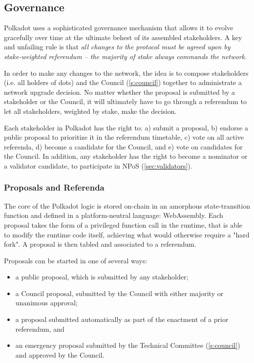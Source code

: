 \subsection{Governance}\label{sec:governance}

Polkadot uses a sophisticated governance mechanism that allows it to evolve gracefully over time at the ultimate behest of its assembled stakeholders. A key and unfailing rule is that \emph{all changes to the protocol must be agreed upon by stake-weighted referendum -- the majority of stake always commands the network.}

In order to make any changes to the network, the idea is to compose stakeholders (i.e. all holders of dots) and the Council (\autoref{s:council}) together to administrate a network upgrade decision. No matter whether the proposal is submitted by a stakeholder or the Council, it will ultimately have to go through a referendum to let all stakeholders, weighted by stake, make the decision.

Each stakeholder in Polkadot has the right to: a) submit a proposal, b) endorse a public proposal to prioritize it in the referendum timetable, c) vote on all active referenda, d) become a candidate for the Council, and e) vote on candidates for the Council. In addition, any stakeholder has the right to become a nominator or a validator candidate, to participate in NPoS (\autoref{sec:validators}).

\subsubsection{Proposals and Referenda}

The core of the Polkadot logic is stored on-chain in an amorphous state-transition function and defined in a platform-neutral language: WebAssembly. Each proposal takes the form of a privileged function call in the runtime, that is able to modify the runtime code itself, achieving what would otherwise require a "hard fork". A proposal is then tabled and associated to a referendum. 

Proposals can be started in one of several ways:
\begin{itemize}
\item a public proposal, which is submitted by any stakeholder;
\item a Council proposal, submitted by the Council with either majority or unanimous approval;
\item a proposal submitted automatically as part of the enactment of a prior referendum, and
\item an emergency proposal submitted by the Technical Committee (\autoref{s:council}) and approved by the Council.
\end{itemize} 

